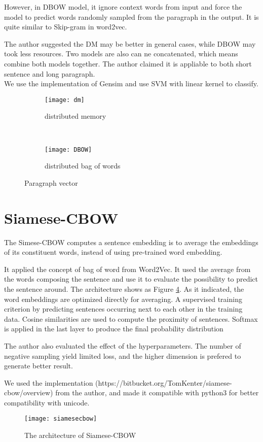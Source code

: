 However, in DBOW model, it ignore context words from input and force the model to predict words randomly sampled from the paragraph in the output.
It is quite similar to Skip-gram in word2vec.

The author suggested the DM may be better in general cases, while DBOW may took less resources. 
Two models are also can ne concatenated, which means combine both models together. The author claimed it is appliable to  both short sentence and long paragraph.\\

We use the implementation of Gensim and use SVM with linear kernel to classify.

\begin{figure}
\centering
\begin{subfigure}{.5\textwidth}
  \centering
  \texttt{[image: dm]}
  \caption{distributed memory}
  \label{fig:dm}
\end{subfigure}~
\begin{subfigure}{.5\textwidth}
  \centering
  \texttt{[image: DBOW]}
  \caption{distributed bag of words}
  \label{fig:dbow}
\end{subfigure}
\caption{Paragraph vector}
\label{fig:PVDM}
\end{figure}

\section{Siamese-CBOW}

	The Simese-CBOW\cite{kenter2016siamesecbow} computes a sentence embedding is to average the embeddings of its
constituent words, instead of using pre-trained word embedding. 

It applied the concept of bag of word from Word2Vec. It used the average from the words composing the sentence and use it to evaluate the possibility to predict the sentence around. 
The architecture shows as Figure \ref{fig:siamese}. As it indicated, the word embeddings are optimized directly for averaging.
A supervised training criterion by predicting sentences occurring next to each other in the training data.
Cosine similarities are used to compute the proximity of sentences.
Softmax is applied in the last layer to produce the final probability distribution

The author also evaluated the effect of the hyperparameters. The number of negative sampling yield limited loss, and the higher dimension is prefered to generate better result.

We used the implementation (https://bitbucket.org/TomKenter/siamese-cbow/overview) from the author, and made it compatible with python3 for better compatibility with unicode.

\begin{figure}[h]
    \centering
	\texttt{[image: siamesecbow]}
    \caption{The architecture of Siamese-CBOW}
    \label{fig:siamese}
\end{figure}
